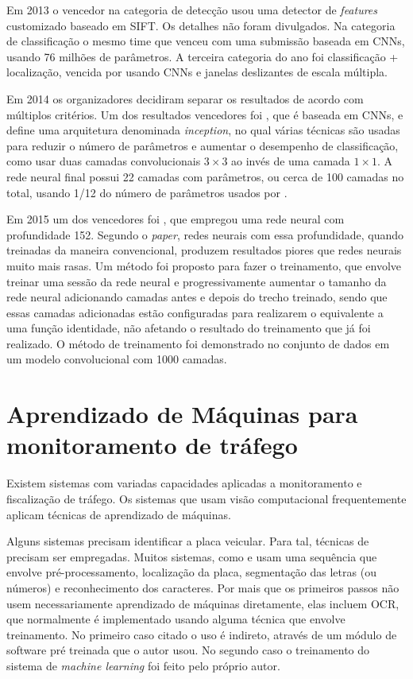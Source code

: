 Em 2013 o vencedor na categoria de detecção usou uma detector de
\emph{features}
customizado baseado em SIFT. Os detalhes não foram divulgados. Na categoria de
classificação o mesmo time que venceu com uma submissão baseada em CNNs, usando
76 milhões de parâmetros. A terceira categoria do ano foi classificação +
localização, vencida por  usando CNNs e
janelas deslizantes de escala múltipla.

Em 2014 os organizadores decidiram separar os resultados de acordo com
múltiplos critérios. Um dos resultados vencedores foi
, que é baseada em CNNs, e define uma arquitetura
denominada \emph{inception}, no qual várias técnicas são usadas para reduzir o
número de parâmetros e aumentar o desempenho de classificação, como usar
duas camadas convolucionais $3 \times 3$ ao invés de uma camada $1 \times 1$. A
rede neural final possui 22 camadas com parâmetros, ou cerca de 100 camadas no
total, usando 1/12 do número de parâmetros usados por
.

Em 2015 um dos vencedores foi , que empregou uma rede
neural com profundidade 152. Segundo o \emph{paper}, redes neurais com essa
profundidade,
quando treinadas da maneira convencional, produzem resultados piores que redes
neurais muito mais rasas. Um método foi proposto para fazer o treinamento, que
envolve treinar uma sessão da rede neural e progressivamente aumentar o tamanho
da rede neural adicionando camadas antes e depois do trecho treinado, sendo que
essas camadas adicionadas estão configuradas para realizarem o equivalente a
uma função identidade, não afetando o resultado do treinamento que já foi
realizado. O método de treinamento foi demonstrado no conjunto de dados
 em um modelo
convolucional com 1000 camadas.

\section{Aprendizado de Máquinas para monitoramento de tráfego}

Existem sistemas com variadas capacidades aplicadas a monitoramento e
fiscalização de tráfego. Os sistemas que usam visão computacional
frequentemente aplicam técnicas de aprendizado de máquinas.

Alguns sistemas precisam identificar a placa veicular. Para tal, técnicas de
 precisam ser empregadas. Muitos sistemas, como
 e  usam uma
sequência que
envolve pré-processamento, localização da placa, segmentação das letras (ou
números) e reconhecimento dos caracteres. Por mais que os primeiros passos não
usem necessariamente aprendizado de máquinas diretamente, elas incluem OCR,
que normalmente é implementado usando alguma técnica que envolve treinamento.
No primeiro caso citado o uso é indireto, através de um módulo de software
pré treinada que o autor usou. No segundo caso o treinamento do sistema de
\emph{machine learning} foi feito pelo próprio autor.

